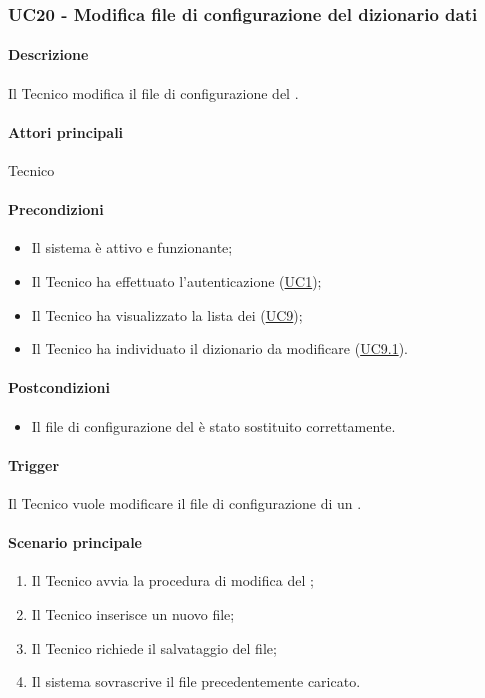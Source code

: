 \subsubsection{UC20 - Modifica file di configurazione del dizionario dati}\label{UC20}

\paragraph*{Descrizione}
Il Tecnico modifica il file di configurazione del . 

\paragraph*{Attori principali}
Tecnico

\paragraph*{Precondizioni}
\begin{itemize}
  \item Il sistema è attivo e funzionante;
  \item Il Tecnico ha effettuato l'autenticazione (\hyperref[UC1]{UC1});
  \item Il Tecnico ha visualizzato la lista dei  (\hyperref[UC9]{UC9});
  \item Il Tecnico ha individuato il dizionario da modificare (\hyperref[UC9.1]{UC9.1}).
\end{itemize}

\paragraph*{Postcondizioni}
\begin{itemize}
  \item Il file di configurazione del  è stato sostituito correttamente.
\end{itemize}

\paragraph*{Trigger}
Il Tecnico vuole modificare il file di configurazione di un .

\paragraph*{Scenario principale}
\begin{enumerate}
  \item Il Tecnico avvia la procedura di modifica del ;
  \item Il Tecnico inserisce un nuovo file;
  \item Il Tecnico richiede il salvataggio del file;
  \item Il sistema sovrascrive il file precedentemente caricato.
\end{enumerate}

